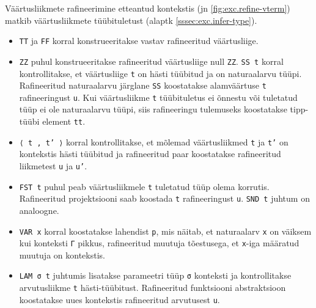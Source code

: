 \documentclass[a4paper,12pt]{article}
\begin{document}
Väärtusliikmete rafineerimine etteantud kontekstis (jn \ref{fig:exc.refine-vterm}) matkib väärtusliikmete tüübituletust (alaptk \ref{sssec:exc.infer-type}).
\begin{itemize}
\item {\tt TT} ja {\tt FF} korral konstrueeritakse vastav rafineeritud väärtusliige.
\item {\tt ZZ} puhul konstrueeritakse rafineeritud väärtusliige null {\tt ZZ}. {\tt SS t} korral kontrollitakse, et väärtusliige {\tt t} on hästi tüübitud ja on naturaalarvu tüüpi. Rafineeritud naturaalarvu järglane {\tt SS} koostatakse alamväärtuse {\tt t} rafineeringust {\tt u}. Kui väärtusliikme {\tt t} tüübituletus ei õnnestu või tuletatud tüüp ei ole naturaalarvu tüüpi, siis rafineeringu tulemuseks koostatakse tipp-tüübi element {\tt tt}.
\item {\tt ⟨ t , t' ⟩} korral kontrollitakse, et mõlemad väärtusliikmed {\tt t} ja {\tt t'} on kontekstis hästi tüübitud ja rafineeritud paar koostatakse rafineeritud liikmetest {\tt u} ja {\tt u'}.
\item {\tt FST t} puhul peab väärtusliikmele {\tt t} tuletatud tüüp olema korrutis. Rafineeritud projektsiooni saab koostada {\tt t} rafineeringust {\tt u}. {\tt SND t} juhtum on analoogne.
\item {\tt VAR x} korral koostatakse lahendist {\tt p}, mis näitab, et naturaalarv {\tt x} on väiksem kui konteksti {\tt Γ} pikkus, rafineeritud muutuja tõestusega, et {\tt x}-iga määratud muutuja on kontekstis.
\item {\tt LAM σ t} juhtumis lisatakse parameetri tüüp {\tt σ} konteksti ja kontrollitakse arvutusliikme {\tt t} hästi-tüübitust. Rafineeritud funktsiooni abstraktsioon koostatakse uues kontekstis rafineeritud arvutusest {\tt u}.
\end{itemize}
\end{document}

